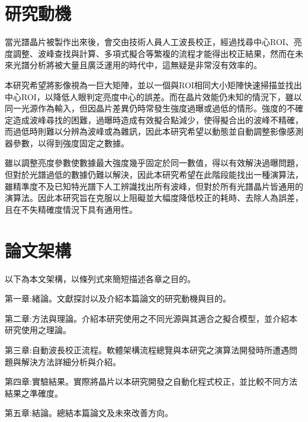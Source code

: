 \section{研究動機}
當光譜晶片被製作出來後，會交由技術人員人工波長校正，經過找尋中心ROI、亮度調整、波峰查找與計算、多項式擬合等繁複的流程才能得出校正結果，然而在未來光譜分析將被大量且廣泛運用的時代中，這無疑是非常沒有效率的。\par
本研究希望將影像視為一巨大矩陣，並以一個與ROI相同大小矩陣快速掃描並找出中心ROI，以降低人眼判定亮度中心的誤差。而在晶片效能仍未知的情況下，雖以同一光源作為輸入，但因晶片差異仍時常發生強度過曝或過低的情形。強度的不確定造成波峰尋找的困難，過曝時造成有效擬合點減少，使得擬合出的波峰不精確，而過低時則難以分辨為波峰或為雜訊，因此本研究希望以動態並自動調整影像感測器參數，以得到強度固定之數據。\par
雖以調整亮度參數使數據最大強度幾乎固定於同一數值，得以有效解決過曝問題，但對於光譜過低的數據仍難以解決，因此本研究希望在此階段能找出一種演算法，雖精準度不及已知特光譜下人工辨識找出所有波峰，但對於所有光譜晶片皆通用的演算法。因此本研究旨在克服以上阻礙並大幅度降低校正的耗時、去除人為誤差，且在不失精確度情況下具有通用性。

\section{論文架構}
以下為本文架構，以條列式來簡短描述各章之目的。\par
第一章:緒論。文獻探討以及介紹本篇論文的研究動機與目的。\par
第二章:方法與理論。介紹本研究使用之不同光源與其適合之擬合模型，並介紹本研究使用之理論。\par
第三章:自動波長校正流程。軟體架構流程總覽與本研究之演算法開發時所遭遇問題與解決方法詳細分析與介紹。\par
第四章:實驗結果。實際將晶片以本研究開發之自動化程式校正，並比較不同方法結果之準確度。\par
第五章:結論。總結本篇論文及未來改善方向。